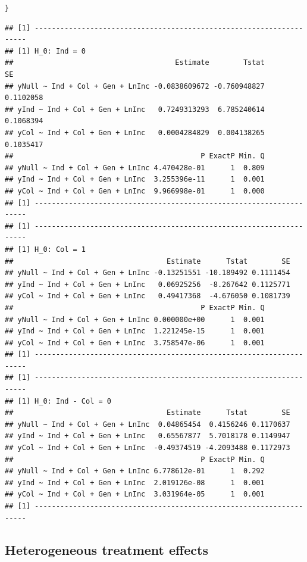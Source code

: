 \documentclass[11pt, a4paper]{article}\usepackage[]{graphicx}\usepackage[]{color}
\makeatletter
\newcommand{\hlstd}[1]{\textcolor[rgb]{0.345,0.345,0.345}{#1}}%
\newenvironment{kframe}{%
 \def\at@end@of@kframe{}%
 \ifinner\ifhmode%
  \def\at@end@of@kframe{\end{minipage}}%
  \begin{minipage}{\columnwidth}%
 \fi\fi%
 \def\FrameCommand##1{\hskip\@totalleftmargin \hskip-\fboxsep
 \colorbox{shadecolor}{##1}\hskip-\fboxsep
     \hskip-\linewidth \hskip-\@totalleftmargin \hskip\columnwidth}%
 \MakeFramed {\advance\hsize-\width
   \@totalleftmargin\z@ \linewidth\hsize
   \@setminipage}}%
 {\par\unskip\endMakeFramed%
 \at@end@of@kframe}
\newenvironment{knitrout}{}{} %
\makeatother
\begin{document}
\begin{knitrout}
\begin{kframe}
\begin{alltt}
    \hlstd{\}}
\end{alltt}
\begin{verbatim}
## [1] --------------------------------------------------------------------
## [1] H_0: Ind = 0
##                                      Estimate        Tstat        SE
## yNull ~ Ind + Col + Gen + LnInc -0.0838609672 -0.760948827 0.1102058
## yInd ~ Ind + Col + Gen + LnInc   0.7249313293  6.785240614 0.1068394
## yCol ~ Ind + Col + Gen + LnInc   0.0004284829  0.004138265 0.1035417
##                                            P ExactP Min. Q
## yNull ~ Ind + Col + Gen + LnInc 4.470428e-01      1  0.809
## yInd ~ Ind + Col + Gen + LnInc  3.255396e-11      1  0.001
## yCol ~ Ind + Col + Gen + LnInc  9.966998e-01      1  0.000
## [1] --------------------------------------------------------------------
## [1] --------------------------------------------------------------------
## [1] H_0: Col = 1
##                                    Estimate      Tstat        SE
## yNull ~ Ind + Col + Gen + LnInc -0.13251551 -10.189492 0.1111454
## yInd ~ Ind + Col + Gen + LnInc   0.06925256  -8.267642 0.1125771
## yCol ~ Ind + Col + Gen + LnInc   0.49417368  -4.676050 0.1081739
##                                            P ExactP Min. Q
## yNull ~ Ind + Col + Gen + LnInc 0.000000e+00      1  0.001
## yInd ~ Ind + Col + Gen + LnInc  1.221245e-15      1  0.001
## yCol ~ Ind + Col + Gen + LnInc  3.758547e-06      1  0.001
## [1] --------------------------------------------------------------------
## [1] --------------------------------------------------------------------
## [1] H_0: Ind - Col = 0
##                                    Estimate      Tstat        SE
## yNull ~ Ind + Col + Gen + LnInc  0.04865454  0.4156246 0.1170637
## yInd ~ Ind + Col + Gen + LnInc   0.65567877  5.7018178 0.1149947
## yCol ~ Ind + Col + Gen + LnInc  -0.49374519 -4.2093488 0.1172973
##                                            P ExactP Min. Q
## yNull ~ Ind + Col + Gen + LnInc 6.778612e-01      1  0.292
## yInd ~ Ind + Col + Gen + LnInc  2.019126e-08      1  0.001
## yCol ~ Ind + Col + Gen + LnInc  3.031964e-05      1  0.001
## [1] --------------------------------------------------------------------
\end{verbatim}
\end{kframe}
\end{knitrout}

    \subsection{Heterogeneous treatment effects}
\end{document}
